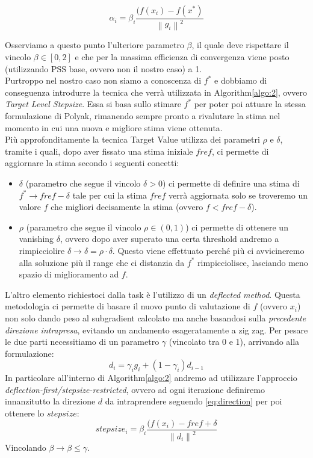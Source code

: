 \documentclass[12pt]{article}
\newcommand{\norm}[1]{\left\lVert#1\right\rVert}
\begin{document}
	\begin{equation}\label{eq:polyak}
		\alpha_i = \beta_i\frac{(f(x_i) - f(x^*)}{\norm{g_i}^2}
	\end{equation}

	Osserviamo a questo punto l’ulteriore parametro $\beta$, il quale deve rispettare il vincolo $\beta \in [0,2]$ e che per la massima efficienza di convergenza viene posto (utilizzando PSS base, ovvero non il nostro caso) a 1.\\
	Purtroppo nel nostro caso non siamo a conoscenza di $f^*$ e dobbiamo di conseguenza introdurre la tecnica che verrà utilizzata in Algorithm\ref{algo:2}, ovvero \textit{Target Level Stepsize}. Essa si basa sullo stimare $f^*$ per poter poi attuare la stessa formulazione di  Polyak, rimanendo sempre pronto a rivalutare la stima nel momento in cui una nuova e migliore stima viene ottenuta.\\
	Più approfonditamente la tecnica Target Value utilizza dei parametri $\rho$ e $\delta$, tramite i quali, dopo aver fissato una stima iniziale $fref$, ci permette di aggiornare la stima secondo i seguenti concetti:
	\begin{itemize}
	\item $\delta$ (parametro che segue il vincolo $\delta > 0$) ci permette di definire una stima di $f^*\longrightarrow fref - \delta$ tale per cui la stima $fref$ verrà aggiornata solo se troveremo un valore $f$ che migliori decisamente la stima (ovvero $f < fref - \delta$).
	\item$\rho$ (parametro che segue il vincolo $\rho \in (0,1)$) ci permette di ottenere un vanishing $\delta$, ovvero dopo aver superato una certa threshold andremo a rimpicciolire $\delta \longrightarrow \delta = \rho \cdot \delta$. Questo viene effettuato perché più ci avvicineremo alla soluzione più il range che ci distanzia da $f^*$ rimpicciolisce, lasciando meno spazio di miglioramento ad $f$.
	\end{itemize}
	L’altro elemento richiestoci dalla task è l’utilizzo di un \textit{deflected method}. Questa metodologia ci permette di basare il nuovo punto di valutazione di $f$ (ovvero $x_i$) non solo dando peso al subgradient calcolato ma anche basandosi sulla \textit{precedente direzione intrapresa}, evitando un andamento esageratamente a zig zag. Per pesare le due parti necessitiamo di un parametro $\gamma$ (vincolato tra 0 e 1), arrivando alla formulazione: 
	\begin{equation}\label{eq:direction}
		d_i = \gamma_ig_i + (1 - \gamma_i) d_{i-1}
	\end{equation}
	In particolare all’interno di Algorithm\ref{algo:2} andremo ad utilizzare l’approccio \textit{deflection-first/stepsize-restricted}, ovvero ad ogni iterazione definiremo innanzitutto la direzione $d$ da intraprendere seguendo \eqref{eq:direction} per poi ottenere lo $stepsize$:
	\begin{equation}\label{eq:stepsize}
		stepsize_i = \beta_i\frac{(f(x_i) - fref + \delta}{\norm{d_i}^2}
	\end{equation}
	Vincolando $\beta \longrightarrow \beta \leq \gamma$.
\end{document}
